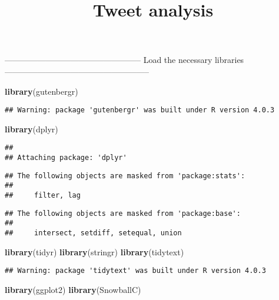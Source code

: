 \documentclass[
]{article}
\title{Tweet analysis}
\author{}
\date{\vspace{-2.5em}}
\newenvironment{Shaded}{\begin{snugshade}}{\end{snugshade}}
\newcommand{\KeywordTok}[1]{\textcolor[rgb]{0.13,0.29,0.53}{\textbf{#1}}}
\newcommand{\NormalTok}[1]{#1}
\begin{document}
\maketitle

-------------------------------------------------- Load the necessary
libraries -----------------------------------------------------

\begin{Shaded}
\begin{Highlighting}[]
\KeywordTok{library}\NormalTok{(gutenbergr)}
\end{Highlighting}
\end{Shaded}

\begin{verbatim}
## Warning: package 'gutenbergr' was built under R version 4.0.3
\end{verbatim}

\begin{Shaded}
\begin{Highlighting}[]
\KeywordTok{library}\NormalTok{(dplyr)}
\end{Highlighting}
\end{Shaded}

\begin{verbatim}
## 
## Attaching package: 'dplyr'
\end{verbatim}

\begin{verbatim}
## The following objects are masked from 'package:stats':
## 
##     filter, lag
\end{verbatim}

\begin{verbatim}
## The following objects are masked from 'package:base':
## 
##     intersect, setdiff, setequal, union
\end{verbatim}

\begin{Shaded}
\begin{Highlighting}[]
\KeywordTok{library}\NormalTok{(tidyr)}
\KeywordTok{library}\NormalTok{(stringr)}
\KeywordTok{library}\NormalTok{(tidytext)}
\end{Highlighting}
\end{Shaded}

\begin{verbatim}
## Warning: package 'tidytext' was built under R version 4.0.3
\end{verbatim}

\begin{Shaded}
\begin{Highlighting}[]
\KeywordTok{library}\NormalTok{(ggplot2)}
\KeywordTok{library}\NormalTok{(SnowballC)}
\end{Highlighting}
\end{Shaded}
\end{document}
